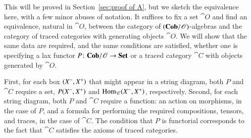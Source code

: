 \documentclass[12pt,oneside,article,draft]{memoir}
\begin{document}
This will be proved in Section~\ref{sec:proof of A}, but we sketch the equivalence here, with a few minor abuses of notation.
It suffices to fix a set $\cat{O}$ and find an equivalence, natural in $\cat{O}$, between the category of $(\mathbf{Cob}/\mathscr{O})$-algebras and the category of traced categories with generating objects $\cat{O}$.
We will show that the same data are required, and the same conditions are satisfied, whether one is specifying a lax functor $P\colon\mathbf{Cob}/\mathscr{O}\to\mathbf{Set}$ or a traced category $\cat{C}$ with objects generated by $\cat{O}$. 

First, for each box $(X^-,X^+)$ that might appear in a string diagram, both $P$ and $\cat{C}$ require a set, $P(X^-,X^+)$ and $\operatorname{Hom}_{\mathscr{C}}(X^-,X^+)$, respectively.
Second, for each string diagram, both $P$ and $\cat{C}$ require a function: an action on morphisms, in the case of $P$, and a formula for performing the required compositions, tensors, and traces, in the case of $\cat{C}$.
The condition that $P$ is functorial corresponds to the fact that $\cat{C}$ satisfies the axioms of traced categories. 
\end{document}
